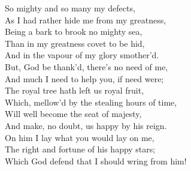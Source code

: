 \documentclass{article}
\begin{document}
\begin{description}
\hspace{1pt}So mighty and so many my defects,\\
\hspace{1pt}As I had rather hide me from my greatness,\\
\hspace{1pt}Being a bark to brook no mighty sea,\\
\hspace{1pt}Than in my greatness covet to be hid,\\
\hspace{1pt}And in the vapour of my glory smother'd.\\
\hspace{1pt}But, God be thank'd, there's no need of me,\\
\hspace{1pt}And much I need to help you, if need were;\\
\hspace{1pt}The royal tree hath left us royal fruit,\\
\hspace{1pt}Which, mellow'd by the stealing hours of time,\\
\hspace{1pt}Will well become the seat of majesty,\\
\hspace{1pt}And make, no doubt, us happy by his reign.\\
\hspace{1pt}On him I lay what you would lay on me,\\
\hspace{1pt}The right and fortune of his happy stars;\\
\hspace{1pt}Which God defend that I should wring from him!\\
\end{description}
\end{document}
